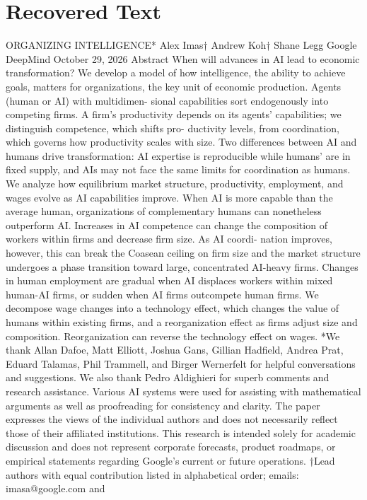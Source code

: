 \section{Recovered Text}
ORGANIZING INTELLIGENCE*
Alex Imas†
Andrew Koh†
Shane Legg
Google DeepMind
October 29, 2026
Abstract
When will advances in AI lead to economic transformation? We develop a
model of how intelligence, the ability to achieve goals, matters for organizations,
the key unit of economic production. Agents (human or AI) with multidimen-
sional capabilities sort endogenously into competing firms. A firm’s productivity
depends on its agents’ capabilities; we distinguish competence, which shifts pro-
ductivity levels, from coordination, which governs how productivity scales with
size. Two differences between AI and humans drive transformation: AI expertise
is reproducible while humans’ are in fixed supply, and AIs may not face the same
limits for coordination as humans. We analyze how equilibrium market structure,
productivity, employment, and wages evolve as AI capabilities improve. When
AI is more capable than the average human, organizations of complementary
humans can nonetheless outperform AI. Increases in AI competence can change
the composition of workers within firms and decrease firm size. As AI coordi-
nation improves, however, this can break the Coasean ceiling on firm size and
the market structure undergoes a phase transition toward large, concentrated
AI-heavy firms. Changes in human employment are gradual when AI displaces
workers within mixed human-AI firms, or sudden when AI firms outcompete
human firms. We decompose wage changes into a technology effect, which changes
the value of humans within existing firms, and a reorganization effect as firms adjust
size and composition. Reorganization can reverse the technology effect on wages.
*We thank Allan Dafoe, Matt Elliott, Joshua Gans, Gillian Hadfield, Andrea Prat, Eduard Talamas,
Phil Trammell, and Birger Wernerfelt for helpful conversations and suggestions. We also thank Pedro
Aldighieri for superb comments and research assistance. Various AI systems were used for assisting
with mathematical arguments as well as proofreading for consistency and clarity. The paper expresses
the views of the individual authors and does not necessarily reflect those of their affiliated institutions.
This research is intended solely for academic discussion and does not represent corporate forecasts,
product roadmaps, or empirical statements regarding Google’s current or future operations.
†Lead authors with equal contribution listed in alphabetical order; emails: imasa@google.com and
